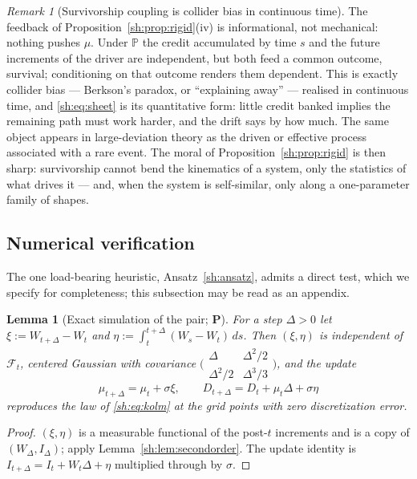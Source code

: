 \documentclass[11pt]{article}
\numberwithin{equation}{section}
\theoremstyle{plain}
\newtheorem{lemma}[theorem]{Lemma}
\theoremstyle{definition}
\theoremstyle{remark}
\newtheorem{remark}[theorem]{Remark}
\newcommand{\PP}{\mathbb{P}}
\newcommand{\Fc}{\mathcal{F}}
\begin{document}
\begin{remark}[Survivorship coupling is collider bias in continuous time]
\label{sh:rem:collider}
The feedback of Proposition~\ref{sh:prop:rigid}(iv) is informational, not
mechanical: nothing pushes $\mu$. Under $\PP$ the credit accumulated by
time $s$ and the future increments of the driver are independent, but
both feed a common outcome, survival; conditioning on that outcome
renders them dependent. This is exactly collider bias --- Berkson's
paradox, or ``explaining away'' --- realised in continuous time, and
\eqref{sh:eq:sheet} is its quantitative form: little credit banked
implies the remaining path must work harder, and the drift says by how
much. The same object appears in large-deviation theory as the driven or
effective process associated with a rare event. The moral of
Proposition~\ref{sh:prop:rigid} is then sharp: survivorship cannot bend
the kinematics of a system, only the statistics of what drives it ---
and, when the system is self-similar, only along a one-parameter family
of shapes.
\end{remark}

\subsection{Numerical verification}\label{sh:sub:numerics}

The one load-bearing heuristic, Ansatz~\ref{sh:ansatz}, admits a direct
test, which we specify for completeness; this subsection may be read as an
appendix.

\begin{lemma}[Exact simulation of the pair; \textbf{P}]\label{sh:lem:exact}
For a step $\Delta>0$ let $\xi:=W_{t+\Delta}-W_t$ and
$\eta:=\int_t^{t+\Delta}(W_s-W_t)\,ds$. Then $(\xi,\eta)$ is independent of
$\Fc_t$, centered Gaussian with covariance
$\bigl(\begin{smallmatrix}\Delta&\Delta^2/2\\
\Delta^2/2&\Delta^3/3\end{smallmatrix}\bigr)$, and the update
\[
\mu_{t+\Delta}=\mu_t+\sigma\xi,\qquad
D_{t+\Delta}=D_t+\mu_t\Delta+\sigma\eta
\]
reproduces the law of \eqref{sh:eq:kolm} at the grid points with zero
discretization error.
\end{lemma}

\begin{proof}
$(\xi,\eta)$ is a measurable functional of the post-$t$ increments and is a
copy of $(W_\Delta,I_\Delta)$; apply Lemma~\ref{sh:lem:secondorder}. The
update identity is
$I_{t+\Delta}=I_t+W_t\Delta+\eta$ multiplied through by $\sigma$.
\end{proof}
\end{document}
